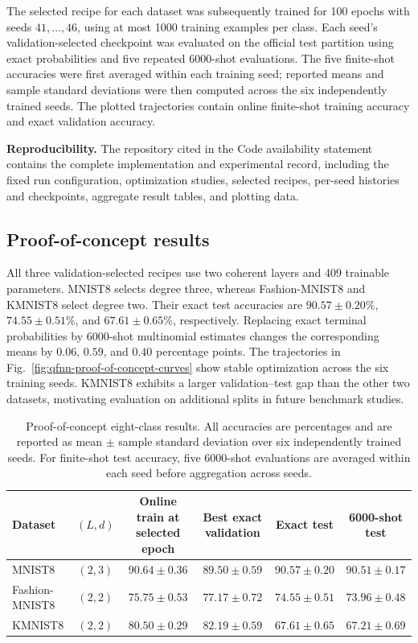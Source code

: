 \documentclass[pdflatex,sn-mathphys,NameDate,iicol]{sn-jnl}
\begin{document}
The selected recipe for each dataset was subsequently trained for 100 epochs
with seeds $41,\ldots,46$, using at most 1000 training examples per class.
Each seed's validation-selected checkpoint was evaluated on the official test
partition using exact probabilities and five repeated 6000-shot evaluations.
The five finite-shot accuracies were first averaged within each training seed;
reported means and sample standard deviations were then computed across the
six independently trained seeds.
The plotted trajectories contain online finite-shot training accuracy and
exact validation accuracy.

\noindent\textbf{Reproducibility.}\quad
The repository cited in the Code availability statement contains the complete
implementation and experimental record, including the fixed run
configuration, optimization studies, selected recipes, per-seed histories and
checkpoints, aggregate result tables, and plotting data.

\clearpage
\onecolumn
\subsection{Proof-of-concept results}
\label{app:empirical-results}

All three validation-selected recipes use two coherent layers and 409
trainable parameters. MNIST8 selects degree three, whereas Fashion-MNIST8 and
KMNIST8 select degree two. Their exact test accuracies are
$90.57\pm0.20\%$, $74.55\pm0.51\%$, and $67.61\pm0.65\%$,
respectively. Replacing exact terminal probabilities by 6000-shot multinomial
estimates changes the corresponding means by $0.06$, $0.59$, and $0.40$
percentage points. The trajectories in
Fig.~\ref{fig:qfnn-proof-of-concept-curves} show stable optimization across
the six training seeds. KMNIST8 exhibits a larger validation--test gap than
the other two datasets, motivating evaluation on additional splits in future
benchmark studies.

\begin{table}[!ht]
\caption{Proof-of-concept eight-class results. All accuracies are percentages
and are reported as mean $\pm$ sample standard deviation over six
independently trained seeds. For finite-shot test accuracy, five 6000-shot
evaluations are averaged within each seed before aggregation across seeds.}
\label{tab:qfnn-proof-of-concept}
\centering
\small
\setlength{\tabcolsep}{4pt}
\begin{tabular}{lccccc}
\toprule
Dataset & $(L,d)$
& Online train at selected epoch
& Best exact validation
& Exact test
& 6000-shot test\\
\midrule
MNIST8
& $(2,3)$ & $90.64\pm0.36$ & $89.50\pm0.59$
& $90.57\pm0.20$ & $90.51\pm0.17$\\
Fashion-MNIST8
& $(2,2)$ & $75.75\pm0.53$ & $77.17\pm0.72$
& $74.55\pm0.51$ & $73.96\pm0.48$\\
KMNIST8
& $(2,2)$ & $80.50\pm0.29$ & $82.19\pm0.59$
& $67.61\pm0.65$ & $67.21\pm0.69$\\
\bottomrule
\end{tabular}
\end{table}
\end{document}
